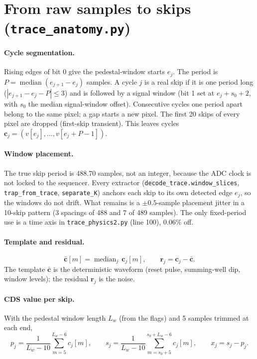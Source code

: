 \documentclass[10pt,a4paper]{article}
\newcommand{\code}[1]{\texttt{\small #1}}
\newcommand{\med}{\operatorname{median}}
\begin{document}
\section{From raw samples to skips (\code{trace\_anatomy.py})}

\paragraph{Cycle segmentation.} Rising edges of bit 0 give the pedestal-window starts $e_j$. The period is
$P=\med(e_{j+1}-e_j)$ samples. A cycle $j$ is a real skip if it is one period long ($|e_{j+1}-e_j-P|\le3$) and is
followed by a signal window (bit 1 set at $e_j+s_0+2$, with $s_0$ the median signal-window offset). Consecutive cycles
one period apart belong to the same pixel; a gap starts a new pixel. The first 20 skips of every pixel are dropped
(first-skip transient). This leaves cycles $\mathbf{c}_j = (v[e_j],\dots,v[e_j+P-1])$.

\paragraph{Window placement.}\label{sec:place} The true skip period is 488.70 samples, not an integer, because the ADC
clock is not locked to the sequencer. Every extractor (\code{decode\_trace.window\_slices}, \code{trap\_from\_trace},
\code{separate\_K}) anchors each skip to its own detected edge $e_j$, so the windows do not drift. What remains is a
$\pm0.5$-sample placement jitter in a 10-skip pattern (3 spacings of 488 and 7 of 489 samples). The only fixed-period use
is a time axis in \code{trace\_physics2.py} (line 100), 0.06\% off.

\paragraph{Template and residual.}
\begin{equation}
\bar{\mathbf c}[m]=\med_j\,\mathbf c_j[m],\qquad \mathbf r_j=\mathbf c_j-\bar{\mathbf c}.
\end{equation}
The template $\bar{\mathbf c}$ is the deterministic waveform (reset pulse, summing-well dip, window levels); the
residual $\mathbf r_j$ is the noise.

\paragraph{CDS value per skip.} With the pedestal window length $L_w$ (from the flags) and 5 samples trimmed at each
end,
\begin{equation}
p_j=\frac{1}{L_w-10}\sum_{m=5}^{L_w-6}c_j[m],\qquad
s_j=\frac{1}{L_w-10}\sum_{m=s_0+5}^{s_0+L_w-6}c_j[m],\qquad
x_j=s_j-p_j .
\end{equation}
\end{document}
